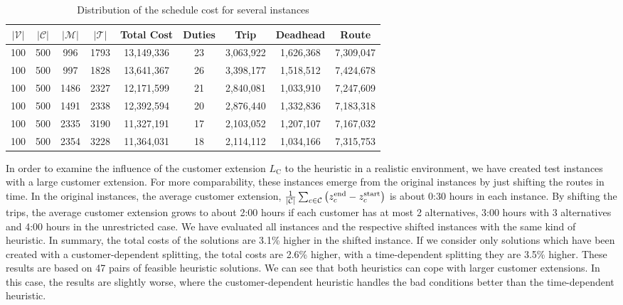 \begin{table}[htb]
	\centering
	\begin{tabular}{ccccccccc}
		\toprule
		$\vert\mathcal{V}\vert$ & $\vert\mathcal{C}\vert$ & $\vert\mathcal{M}\vert$ & $\vert\mathcal{T}\vert$ & Total Cost & Duties & Trip & Deadhead & Route \\
		\midrule
		100 & 500 &  996 & 1793 & 13,149,336 & 23 & 3,063,922 & 1,626,368 & 7,309,047 \\
		100 & 500 &  997 & 1828 & 13,641,367 & 26 & 3,398,177 & 1,518,512 & 7,424,678 \\
		100 & 500 & 1486 & 2327 & 12,171,599 & 21 & 2,840,081 & 1,033,910 & 7,247,609 \\
		100 & 500 & 1491 & 2338 & 12,392,594 & 20 & 2,876,440 & 1,332,836 & 7,183,318 \\
		100 & 500 & 2335 & 3190 & 11,327,191 & 17 & 2,103,052 & 1,207,107 & 7,167,032 \\
		100 & 500 & 2354 & 3228 & 11,364,031 & 18 & 2,114,112 & 1,034,166 & 7,315,753 \\
		\bottomrule
	\end{tabular}
	\caption{Distribution of the schedule cost for several instances	}
	\label{tab:results:general}
\end{table}

In order to examine the influence of the customer extension $L_{\operatorname{C}}$ to the heuristic in a realistic environment, we have created test instances with a large customer extension. For more comparability, these instances emerge from the original instances by just shifting the routes in time. In the original instances, the average customer extension, \ie ${\frac{1}{\vert\mathcal{C}\vert}\sum_{c\in\mathcal{C}}\left(z^{\operatorname{end}}_c - z^{\operatorname{start}}_c\right)}$ is about 0:30 hours in each instance. By shifting the trips, the average customer extension grows to about 2:00 hours if each customer has at most 2 alternatives, 3:00 hours with 3 alternatives and 4:00 hours in the unrestricted case. We have evaluated all instances and the respective shifted instances with the same kind of heuristic. In summary, the total costs of the solutions are 3.1\% higher in the shifted instance. If we consider only solutions which have been created with a customer-dependent splitting, the total costs are 2.6\% higher, with a time-dependent splitting they are 3.5\% higher. These results are based on 47 pairs of feasible heuristic solutions. We can see that both heuristics can cope with larger customer extensions. In this case, the results are slightly worse, where the customer-dependent heuristic handles the bad conditions better than the time-dependent heuristic.

